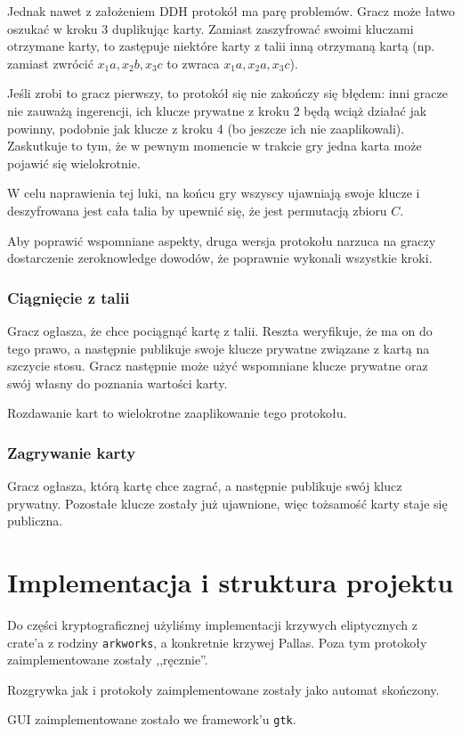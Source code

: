 \documentclass{article}
\begin{document}
Jednak nawet z założeniem DDH protokół ma parę problemów. Gracz może łatwo oszukać w kroku 3 duplikując karty. Zamiast zaszyfrować swoimi kluczami otrzymane karty, to zastępuje niektóre karty z talii inną otrzymaną kartą (np. zamiast zwrócić $x_1a,x_2b,x_3c$ to zwraca $x_1a,x_2a,x_3c$).

Jeśli zrobi to gracz pierwszy, to protokół się nie zakończy się błędem: inni gracze nie zauważą ingerencji, ich klucze prywatne z kroku 2 będą wciąż działać jak powinny, podobnie jak klucze z kroku 4 (bo jeszcze ich nie zaaplikowali). Zaskutkuje to tym, że w pewnym momencie w trakcie gry jedna karta może pojawić się wielokrotnie.

W celu naprawienia tej luki, na końcu gry wszyscy ujawniają swoje klucze i deszyfrowana jest cała talia by upewnić się, że jest permutacją zbioru $C$.

Aby poprawić wspomniane aspekty, druga wersja protokołu narzuca na graczy dostarczenie zero\-knowledge dowodów, że poprawnie wykonali wszystkie kroki.




\subsubsection{Ciągnięcie z talii}

Gracz ogłasza, że chce pociągnąć kartę z talii. Reszta weryfikuje, że ma on do tego prawo, a następnie publikuje swoje klucze prywatne związane z kartą na szczycie stosu. Gracz następnie może użyć wspomniane klucze prywatne oraz swój własny do poznania wartości karty.

Rozdawanie kart to wielokrotne zaaplikowanie tego protokołu.

\subsubsection{Zagrywanie karty}

Gracz ogłasza, którą kartę chce zagrać, a następnie publikuje swój klucz prywatny. Pozostałe klucze zostały już ujawnione, więc tożsamość karty staje się publiczna.

\section{Implementacja i struktura projektu}

Do części kryptograficznej użyliśmy implementacji krzywych eliptycznych z crate'a z rodziny \texttt{arkworks}, a konkretnie krzywej Pallas. Poza tym protokoły zaimplementowane zostały ,,ręcznie''.

Rozgrywka jak i protokoły zaimplementowane zostały jako automat skończony.

GUI zaimplementowane zostało we framework'u \texttt{gtk}.
\end{document}
